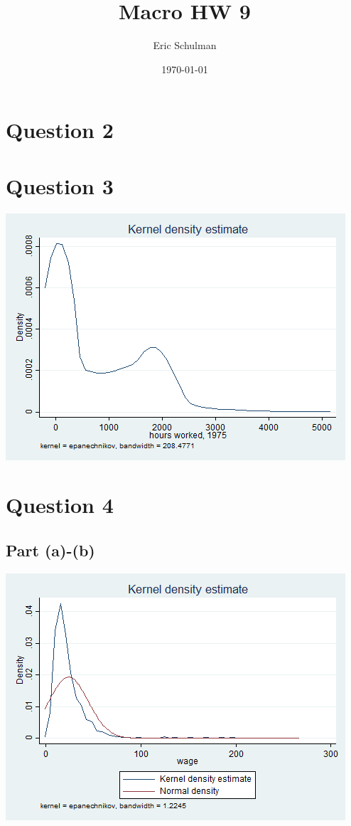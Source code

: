 \documentclass{article}
\title{Macro HW 9}
\author{Eric Schulman}
\date{\today}
\begin{document}
\maketitle

\section{Question 2}

\section{Question 3}

\begin{center}
    \includegraphics[scale=.6]{../plots/q3_graph}
\end{center}

\section{Question 4}

\subsection{Part (a)-(b)}

\begin{center}
    \includegraphics[scale=.6]{../plots/q4_graph1}
\end{center}
\end{document}
